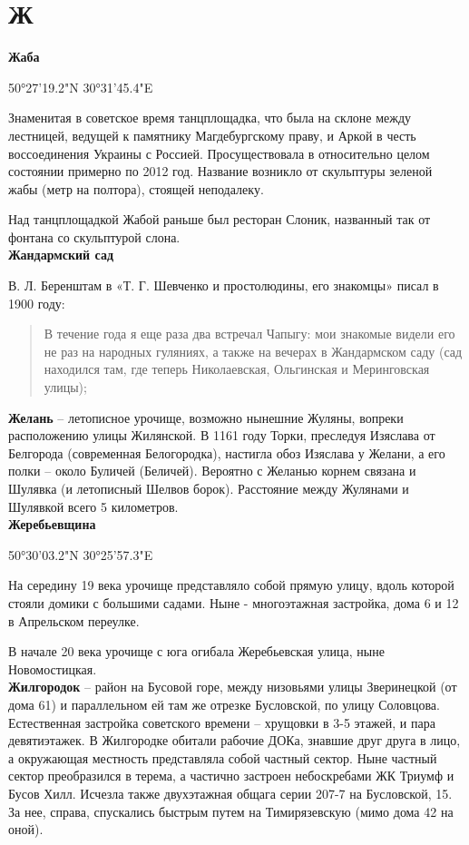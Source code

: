 \chapter*{Ж}

\textbf{Жаба}

50°27'19.2"N 30°31'45.4"E

Знаменитая в советское время танцплощадка, что была на склоне между лестницей, ведущей к памятнику Магдебургскому праву, и Аркой в честь воссоединения Украины с Россией. Просуществовала в относительно целом состоянии  примерно по 2012 год. Название возникло от скульптуры зеленой жабы (метр на полтора), стоящей неподалеку.

Над танцплощадкой Жабой раньше был ресторан Слоник, названный так от фонтана со скульптурой слона.\\

\textbf{Жандармский сад} 

В. Л. Беренштам в «Т. Г. Шевченко и простолюдины, его знакомцы» писал в 1900 году:

\begin{quotation}
В течение года я еще раза два встречал Чапыгу: мои знакомые видели его не раз на народных гуляниях, а также на вечерах в Жандармском саду (сад находился там, где теперь Николаевская, Ольгинская и Меринговская улицы);
\end{quotation}

\textbf{Желань} – летописное урочище, возможно нынешние Жуляны, вопреки расположению улицы Жилянской. В 1161 году Торки, преследуя Изяслава от Белгорода (современная Белогородка), настигла обоз Изяслава у Желани, а его полки – около Буличей (Беличей). Вероятно с Желанью корнем связана и Шулявка (и летописный Шелвов борок). Расстояние между Жулянами и Шулявкой всего 5 километров.\\ 

\textbf{Жеребьевщина}

50°30'03.2"N 30°25'57.3"E

На середину 19 века урочище представляло собой прямую улицу, вдоль которой стояли домики с большими садами. Ныне - многоэтажная застройка, дома 6 и 12 в Апрельском переулке.


В начале 20 века урочище с юга огибала Жеребьевская улица, ныне Новомостицкая.\\


\textbf{Жилгородок} – район на Бусовой горе, между низовьями улицы Зверинецкой (от дома 61) и параллельном ей там же отрезке Бусловской, по улицу Соловцова. Естественная застройка советского времени – хрущовки в 3-5 этажей, и пара девятиэтажек. В Жилгородке обитали рабочие ДОКа, знавшие друг друга в лицо, а окружающая местность представляла собой частный сектор. Ныне частный сектор преобразился в терема, а частично застроен небоскребами ЖК Триумф и Бусов Хилл. Исчезла также двухэтажная общага серии 207-7 на Бусловской, 15. За нее, справа, спускались быстрым путем на Тимирязевскую (мимо дома 42 на оной).

